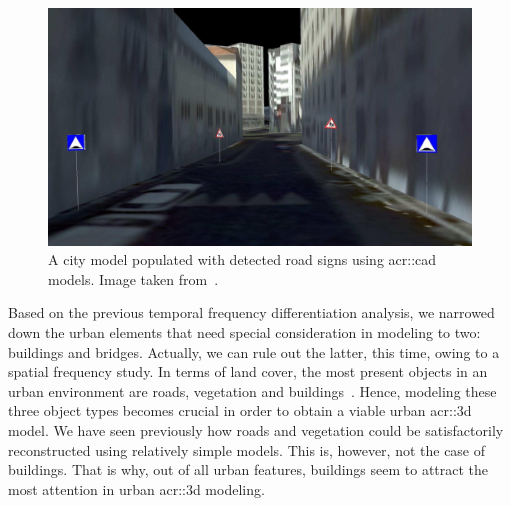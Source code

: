             \begin{figure}[htb]
                \centering
                \includegraphics[width=\textwidth]{images/introduction/modeling_road_signs}
                \caption[
                    A city model populated with detected road signs using \acrshort*{acr::cad} models.
                ]{
                    \label{fig::3d_road_signs_models}
                    A city model populated with detected road signs using \gls{acr::cad} models.
                    Image taken from~\parencite{soheilian2013detection}.
                }
            \end{figure}

            Based on the previous temporal frequency differentiation analysis, we narrowed down the urban elements that need special consideration in modeling to two: buildings and bridges. 
            Actually, we can rule out the latter, this time, owing to a spatial frequency study.
            In terms of land cover, the most present objects in an urban environment are roads, vegetation and buildings~\parencite{oecd2020land}.
            Hence, modeling these three object types becomes crucial in order to obtain a viable urban \gls{acr::3d} model.
            We have seen previously how roads and vegetation could be satisfactorily reconstructed using relatively simple models.
            This is, however, not the case of buildings.
            That is why, out of all urban features, buildings seem to attract the most attention in urban \gls{acr::3d} modeling.

            \addtocounter{footnote}{-1}
            \addtocounter{footnote}{1}

